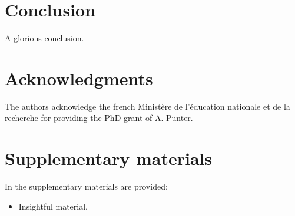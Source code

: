\documentclass[aip,reprint]{revtex4-1}
\begin{document}
\section{Conclusion}

A glorious conclusion.

\section{Acknowledgments}
The authors acknowledge the french Ministère de l'éducation
nationale et de la recherche for providing the PhD grant of A. Punter.

\section{Supplementary materials}
In the supplementary materials are provided:
\begin{itemize}
\item Insightful material.
\end{itemize}


\end{document}
